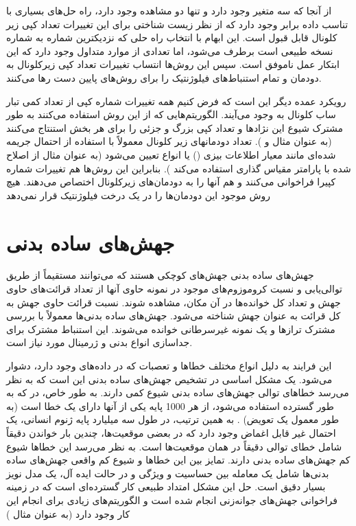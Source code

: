از آنجا که سه متغیر وجود دارد و تنها دو مشاهده وجود دارد، راه حل‌های بسیاری با تناسب داده برابر وجود دارد که از نظر زیست شناختی برای این تغییرات تعداد کپی زیر کلونال قابل قبول است. این ابهام با انتخاب راه حلی که نزدیکترین شماره به شماره نسخه طبیعی است برطرف می‌شود، اما تعدادی از موارد متداول وجود دارد که این ابتکار عمل ناموفق است. سپس این روش‌ها انتساب تغییرات تعداد کپی زیرکلونال به دودمان و تمام استنباط‌های فیلوژنتیک را برای روش‌های پایین دست رها می‌کنند.


رویکرد عمده دیگر این است که فرض کنیم همه تغییرات شماره کپی از تعداد کمی تبار ساب کلونال به وجود می‌آیند. الگوریتم‌هایی که از این روش استفاده می‌کنند به طور مشترک شیوع این نژادها و تعداد کپی بزرگ و جزئی را برای هر بخش استنتاج می‌کنند (به عنوان مثال \cite{zhu2011metabolic, vander2009understanding} و  ).  تعداد دودمانهای زیر کلونال معمولاً با استفاده از احتمال جریمه شده‌ای مانند معیار اطلاعات بیزی () یا انواع  تعیین می‌شود (به عنوان مثال  از  اصلاح شده با پارامتر مقیاس گذاری استفاده می‌کند \cite{zhu2011metabolic}). بنابراین این روش‌ها هم تغییرات شماره کپیرا فراخوانی می‌کنند و هم آنها را به دودمان‌های زیرکلونال اختصاص می‌دهند. هیچ روش موجود این دودمان‌ها را در یک درخت فیلوژنتیک قرار نمی‌دهد



\section{جهش‌های ساده بدنی }

جهش‌های ساده بدنی جهش‌های کوچکی هستند که می‌توانند مستقیماً از طریق توالی‌یابی و نسبت کروموزوم‌های موجود در نمونه حاوی آنها از تعداد قرائت‌های حاوی جهش و تعداد کل خوانده‌ها در آن مکان، مشاهده شوند. نسبت قرائت حاوی جهش به کل قرائت به عنوان  جهش شناخته می‌شود. جهش‌های ساده بدنی‌ها معمولاً با بررسی مشترک ترازها و یک نمونه غیر‌سرطانی خوانده می‌شوند. این استنباط مشترک برای جداسازی انواع بدنی و ژرمینال مورد نیاز است.

این فرایند به دلیل انواع مختلف خطاها و تعصبات که در داده‌های  وجود دارد، دشوار می‌شود\cite{friedl2010plasticity}. یک مشکل اساسی در تشخیص جهش‌های ساده بدنی این است که به نظر می‌رسد خطاهای توالی جهش‌های ساده بدنی شیوع کمی دارند. به طور خاص، در    که به طور گسترده استفاده می‌شود، از هر 1000 پایه یکی از آنها دارای یک خطا است (به طور معمول یک تعویض) \cite{sabeh2009protease}. به همین ترتیب، در طول سه میلیارد پایه ژنوم انسانی، یک احتمال غیر قابل اغماض وجود دارد که در بعضی موقعیت‌ها، چندین بار خواندن دقیقاً شامل خطای توالی دقیقاً در همان موقعیت‌ها است. به نظر می‌رسد این خطاها شیوع کم جهش‌های ساده بدنی دارند. تمایز بین این خطاها و شیوع کم واقعی جهش‌های ساده بدنی‌ها شامل یک معامله بین حساسیت و ویژگی و در حالت ایده آل، یک مدل نویز بسیار دقیق است. حل این مشکل امتداد طبیعی کار گسترده‌ای است که در زمینه فراخوانی جهش‌های جوانه‌زنی انجام شده است و الگوریتم‌های زیادی برای انجام این کار وجود دارد (به عنوان مثال \cite{friedl2010plasticity, demicheli2008effects} )


